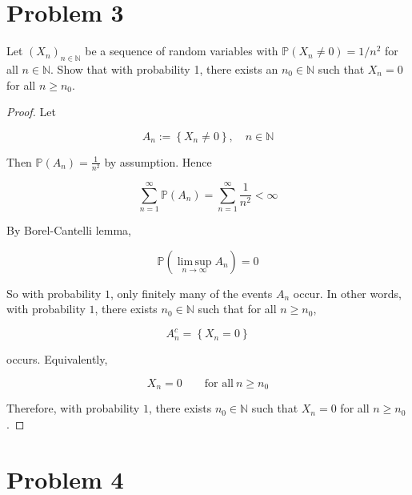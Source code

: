 \section{Problem 3}\label{hw05-problem-3}

Let \(\left( \mathit{X}_{\mathit{n}} \right)_{\mathit{n} \in \mathbb{N}}\) be a sequence of random variables with \(\mathbb{P}\left( {\mathit{X}_{\mathit{n}} \neq 0} \right) = 1/\mathit{n}^{2}\) for all \(\mathit{n} \in \mathbb{N}\). Show that with probability 1, there exists an \(\mathit{n}_{0} \in \mathbb{N}\) such that \(\mathit{X}_{\mathit{n}} = 0\) for all \(\mathit{n} \geq \mathit{n}_{0}\).

\begin{proof}

Let

\[\mathit{A}_{\mathit{n}} := \left\{ {\mathit{X}_{\mathit{n}} \neq 0} \right\},\quad\mathit{n} \in \mathbb{N}\]

Then \(\mathbb{P}(\mathit{A}_{\mathit{n}}) = \frac{1}{\mathit{n}^{2}}\) by assumption. Hence

\[\sum\limits_{\mathit{n} = 1}^{\infty}\mathbb{P}(\mathit{A}_{\mathit{n}}) = \sum\limits_{\mathit{n} = 1}^{\infty}\frac{1}{\mathit{n}^{2}} < \infty\]

By Borel-Cantelli lemma,

\[\mathbb{P}\left( {\operatorname{lim\, sup}\limits_{\mathit{n}\rightarrow\infty}\mathit{A}_{\mathit{n}}} \right) = 0\]

So with probability \(1\), only finitely many of the events \(\mathit{A}_{\mathit{n}}\) occur. In other words, with probability \(1\), there exists \(\mathit{n}_{0} \in \mathbb{N}\) such that for all \(\mathit{n} \geq \mathit{n}_{0}\),

\[\mathit{A}_{\mathit{n}}^{\mathit{c}} = \left\{ {\mathit{X}_{\mathit{n}} = 0} \right\}\]

occurs. Equivalently,

\[\mathit{X}_{\mathit{n}} = 0\qquad\text{for all}\ \mathit{n} \geq \mathit{n}_{0}\]

Therefore, with probability \(1\), there exists \(\mathit{n}_{0} \in \mathbb{N}\) such that \(\mathit{X}_{\mathit{n}} = 0\) for all \(\mathit{n} \geq \mathit{n}_{0}\).

\end{proof}

\section{Problem 4}\label{hw05-problem-4}

